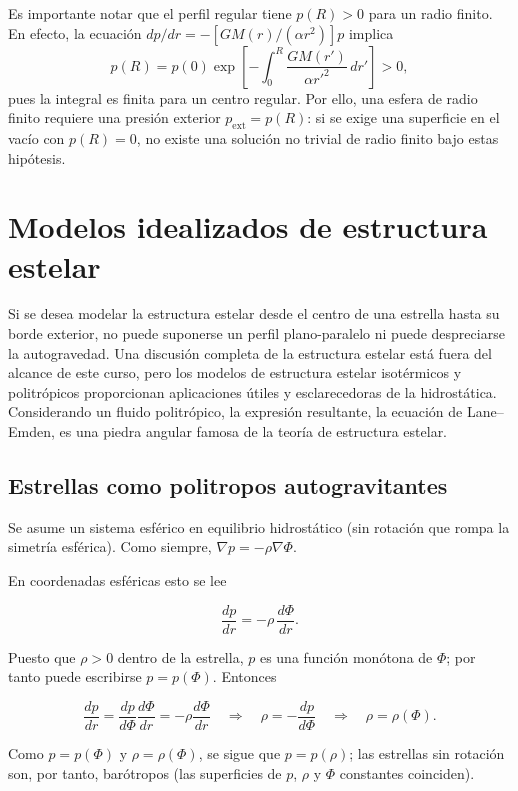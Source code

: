 \begin{enumerate}
Es importante notar que el perfil regular tiene $p(R)>0$ para un radio finito. En efecto, la ecuación $dp/dr=-[GM(r)/(\alpha r^2)]p$ implica
$$
p(R)=p(0)\exp\!\left[-\int_0^R\frac{GM(r')}{\alpha r'^2}\,dr'\right]>0,
$$
pues la integral es finita para un centro regular. Por ello, una esfera de radio finito requiere una presión exterior $p_{\mathrm{ext}}=p(R)$: si se exige una superficie en el vacío con $p(R)=0$, no existe una solución no trivial de radio finito bajo estas hipótesis.
\end{enumerate}

\section{Modelos idealizados de estructura estelar}

Si se desea modelar la estructura estelar desde el centro de una estrella hasta su borde exterior, no puede suponerse un perfil plano-paralelo ni puede despreciarse la autogravedad. Una discusión completa de la estructura estelar está fuera del alcance de este curso, pero los modelos de estructura estelar isotérmicos y politrópicos proporcionan aplicaciones útiles y esclarecedoras de la hidrostática. Considerando un fluido politrópico, la expresión resultante, la ecuación de Lane--Emden, es una piedra angular famosa de la teoría de estructura estelar.

\figuraTemperaturaSolar

\subsection{Estrellas como politropos autogravitantes}

Se asume un sistema esférico en equilibrio hidrostático (sin rotación que rompa la simetría esférica). Como siempre, $\nabla p = -\rho\nabla\Phi$.

En coordenadas esféricas esto se lee

$$ \frac{dp}{dr} = -\rho\,\frac{d\Phi}{dr}. $$

Puesto que $\rho > 0$ dentro de la estrella, $p$ es una función monótona de $\Phi$; por tanto puede escribirse $p = p(\Phi)$. Entonces

$$ \frac{dp}{dr} = \frac{dp}{d\Phi}\frac{d\Phi}{dr} = -\rho\frac{d\Phi}{dr} \quad\Rightarrow\quad \rho = -\frac{dp}{d\Phi} \quad\Rightarrow\quad \rho = \rho(\Phi). $$

Como $p = p(\Phi)$ y $\rho = \rho(\Phi)$, se sigue que $p = p(\rho)$; las estrellas sin rotación son, por tanto, barótropos (las superficies de $p$, $\rho$ y $\Phi$ constantes coinciden).

